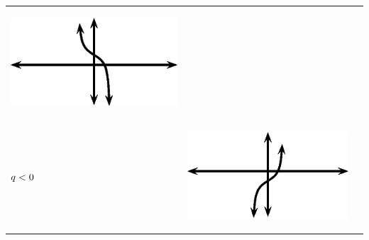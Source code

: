 \begin{center}
\begin{xtabular*}{\mytablewidth}[t]{|p{10\mystarwidth}|p{10\mystarwidth}|p{10\mystarwidth}|}
    \setcounter{subfigure}{0}
\label{m39414*id90993}
    \begin{center}
    \label{m39414*id90993!!!underscore!!!media}\label{m39414*id90993!!!underscore!!!printimage}\includegraphics{col11306.imgs/m39414_MG10C15_035.png} %
      \vspace{2pt}
    \vspace{.1in}
    \end{center}    
     \tabularnewline{}
                  $q<{}0$
                 &
    \setcounter{subfigure}{0}
\label{m39414*id91030}
    \begin{center}
    \label{m39414*id91030!!!underscore!!!media}\label{m39414*id91030!!!underscore!!!printimage}\includegraphics{col11306.imgs/m39414_MG10C15_036.png} %
      \vspace{2pt}
    \vspace{.1in}
    \end{center}    
                 &

\end{xtabular*}
\end{center}
